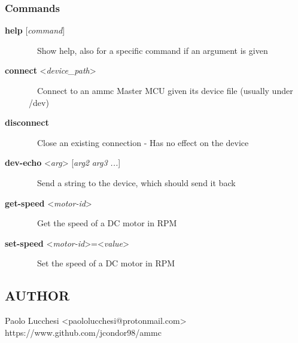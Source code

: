 \subsubsection*{Commands}
\begin{description}
  \item[\textbf{help} [\emph{command}\textrm{]}]
  \ \ Show help, also for a specific command if an argument is given

  \item[\textbf{connect} <\emph{device\_path}>]
  \ \ Connect to an ammc Master MCU given its device file (usually under /dev)

  \item[\textbf{disconnect}]
  \ \ Close an existing connection - Has no effect on the device

  \item[\textbf{dev-echo} <\emph{arg}> [\emph{arg2} \emph{arg3} \emph{...}\textrm{]}]
  \ \ Send a string to the device, which should send it back

  \item[\textbf{get-speed} <\emph{motor-id}>]
  \ \ Get the speed of a DC motor in RPM

  \item[\textbf{set-speed} <\emph{motor-id}>=<\emph{value}>]
  \ \ Set the speed of a DC motor in RPM
\end{description}

\subsection*{AUTHOR}
Paolo Lucchesi <paololucchesi@protonmail.com> \\
https://www.github.com/jcondor98/ammc
